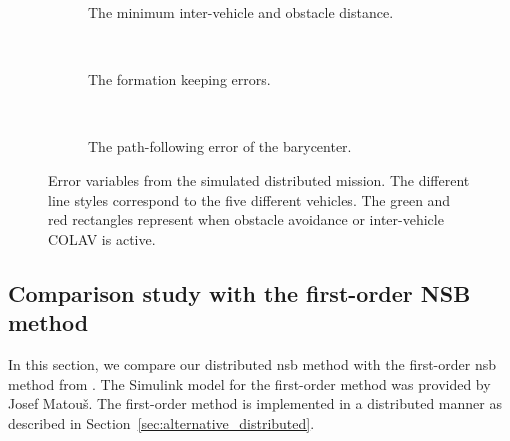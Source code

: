 \begin{figure}[htbp]
    \centering
    \begin{subfigure}[t]{.9\textwidth}
    \centering
    \setlength{}
    \setlength\figureheight{3cm}
    
    \vspace*{-2mm}
    \caption{The minimum inter-vehicle and obstacle distance.}
    \label{fig:distributed_collision_avoidance}
    \end{subfigure}
    \\
    \begin{subfigure}[t]{.9\textwidth}
    \centering
    \setlength{}
    \setlength\figureheight{3cm}
    
    \vspace*{-2mm}
    \caption{The formation keeping errors. }
    \label{fig:distributed_formation_keeping_error}
    \end{subfigure}
    \\
    \begin{subfigure}[t]{.9\textwidth}
    \centering
    \setlength{}
    \setlength\figureheight{3cm}
    
    \vspace*{-2mm}
    \caption{The path-following error of the barycenter.}
    \label{fig:distributed_path_following_error}
    \end{subfigure}
    \vspace*{-2mm}
    \caption{Error variables from the simulated distributed mission. The different line styles correspond to the five different vehicles. The green and red rectangles represent when obstacle avoidance or inter-vehicle COLAV is active.}
    \label{fig:distributed_sim_results}
\end{figure}

\subsection{Comparison study with the first-order NSB method}\label{sec:comparison_distributed_NSB}
In this section, we compare our distributed \gls{nsb} method with the first-order \gls{nsb} method from \cite{matous_formation_2023}. The Simulink model for the first-order method was provided by Josef Matou\v{s}. The first-order method is implemented in a  distributed manner as described in Section~\ref{sec:alternative_distributed}. 

